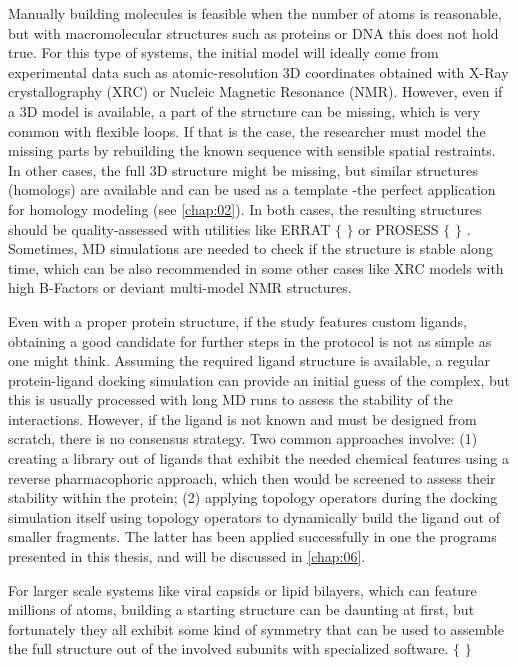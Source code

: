 Manually building molecules is feasible when the number of atoms is reasonable, but with macromolecular structures such as proteins or DNA this does not hold true. For this type of systems, the initial model will ideally come from experimental data such as atomic-resolution 3D coordinates obtained with X-Ray crystallography (XRC) or Nucleic Magnetic Resonance (NMR). However, even if a 3D model is available, a part of the structure can be missing, which is very common with flexible loops. If that is the case, the researcher must model the missing parts by rebuilding the known sequence with sensible spatial restraints. In other cases, the full 3D structure might be missing, but similar structures (homologs) are available and can be used as a template -the perfect application for homology modeling (see \autoref{chap:02}). In both cases, the resulting structures should be quality-assessed with utilities like ERRAT $ \{ $ $ \} $  or PROSESS $ \{ $ $ \} $ . Sometimes, MD simulations are needed to check if the structure is stable along time, which can be also recommended in some other cases like XRC models with high B-Factors or deviant multi-model NMR structures.

Even with a proper protein structure, if the study features custom ligands, obtaining a good candidate for further steps in the protocol is not as simple as one might think. Assuming the required ligand structure is available, a regular protein-ligand docking simulation can provide an initial guess of the complex, but this is usually processed with long MD runs to assess the stability of the interactions. However, if the ligand is not known and must be designed from scratch, there is no consensus strategy. Two common approaches involve: (1) creating a library out of ligands that exhibit the needed chemical features using a reverse pharmacophoric approach, which then would be screened to assess their stability within the protein; (2) applying topology operators during the docking simulation itself using topology operators to dynamically build the ligand out of smaller fragments. The latter has been applied successfully in one the programs presented in this thesis, and will be discussed in \autoref{chap:06}.

For larger scale systems like viral capsids or lipid bilayers, which can feature millions of atoms, building a starting structure can be daunting at first, but fortunately they all exhibit some kind of symmetry that can be used to assemble the full structure out of the involved subunits with specialized software. $ \{ $ $ \} $

